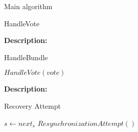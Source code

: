 \documentclass[10pt,a4paper]{article}
\begin{document}
\begin{section}{Main algorithm}
\begin{subsection}{HandleVote}
\begin{algorithm}[H]
\begin{algorithmic}[1]
                \If{}
                \EndIf

            \EndIf


        \EndFunction
        \end{algorithmic}
        \caption{\underline{HandleVote}}
    \end{algorithm}
    
    
    \noindent \textbf{Description:}\\
    
\end{subsection}


\begin{subsection}{HandleBundle}\label{ssect:HandleBundle}

    \begin{algorithm}[H]
        \begin{algorithmic}[1]

                    \State $HandleVote(vote)$
                \EndFor
            \EndIf

        \EndFunction
        \end{algorithmic}
        \caption{\underline{HandleBundle}}
    \end{algorithm}
    
    
    \noindent \textbf{Description:}\\
    
\end{subsection}


\begin{subsection}{Recovery Attempt}\label{ssect:Recovery}

    \begin{algorithm}[H]
        \begin{algorithmic}[1]

        \State $s \gets next_s$
        \State $ResynchronizationAttempt()$
    

\end{algorithmic}
\end{algorithm}
\end{subsection}
\end{section}
\end{document}
